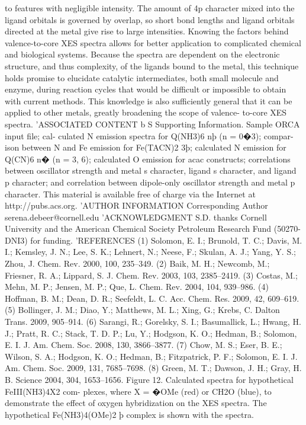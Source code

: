 to features with negligible intensity. The amount of 4p character
mixed into the ligand orbitals is governed by overlap, so short
bond lengths and ligand orbitals directed at the metal give rise to
large intensities.
Knowing the factors behind valence-to-core XES spectra
allows for better application to complicated chemical and
biological systems. Because the spectra are dependent on the
electronic structure, and thus complexity, of the ligands bound to
the metal, this technique holds promise to elucidate catalytic
intermediates, both small molecule and enzyme, during reaction
cycles that would be diﬃcult or impossible to obtain with current
methods. This knowledge is also suﬃciently general that it can be
applied to other metals, greatly broadening the scope of valence-
to-core XES spectra.
’ASSOCIATED CONTENT
b
S
Supporting Information.
Sample ORCA input ﬁle; cal-
culated N emission spectra for Q(NH3)6
nþ (n = 0�3); compar-
ison between N and Fe emission for Fe(TACN)2
3þ; calculated
N emission for Q(CN)6
n� (n = 3, 6); calculated O emission for
acac constructs; correlations between oscillator strength and
metal s character, ligand s character, and ligand p character;
and correlation between dipole-only oscillator strength and
metal p character. This material is available free of charge via
the Internet at http://pubs.acs.org.
’AUTHOR INFORMATION
Corresponding Author
serena.debeer@cornell.edu
’ACKNOWLEDGMENT
S.D. thanks Cornell University and the American Chemical
Society Petroleum Research Fund (50270-DNI3) for funding.
’REFERENCES
(1) Solomon, E. I.; Brunold, T. C.; Davis, M. I.; Kemsley, J. N.; Lee,
S. K.; Lehnert, N.; Neese, F.; Skulan, A. J.; Yang, Y. S.; Zhou, J. Chem. Rev.
2000, 100, 235–349.
(2) Baik, M. H.; Newcomb, M.; Friesner, R. A.; Lippard, S. J. Chem.
Rev. 2003, 103, 2385–2419.
(3) Costas, M.; Mehn, M. P.; Jensen, M. P.; Que, L. Chem. Rev. 2004,
104, 939–986.
(4) Hoﬀman, B. M.; Dean, D. R.; Seefeldt, L. C. Acc. Chem. Res. 2009,
42, 609–619.
(5) Bollinger, J. M.; Diao, Y.; Matthews, M. L.; Xing, G.; Krebs, C.
Dalton Trans. 2009, 905–914.
(6) Sarangi, R.; Gorelsky, S. I.; Basumallick, L.; Hwang, H. J.; Pratt,
R. C.; Stack, T. D. P.; Lu, Y.; Hodgson, K. O.; Hedman, B.; Solomon, E. I.
J. Am. Chem. Soc. 2008, 130, 3866–3877.
(7) Chow, M. S.; Eser, B. E.; Wilson, S. A.; Hodgson, K. O.; Hedman,
B.; Fitzpatrick, P. F.; Solomon, E. I. J. Am. Chem. Soc. 2009, 131,
7685–7698.
(8) Green, M. T.; Dawson, J. H.; Gray, H. B. Science 2004, 304,
1653–1656.
Figure 12. Calculated spectra for hypothetical FeIII(NH3)4X2 com-
plexes, where X = �OMe (red) or CH2O (blue), to demonstrate the
eﬀect of oxygen hybridization on the XES spectra. The hypothetical
Fe(NH3)4(OMe)2
þ complex is shown with the spectra.




